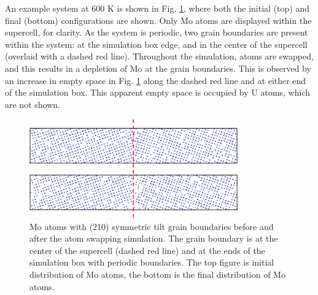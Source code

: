 \documentclass[review]{elsarticle}
\begin{document}
An example system at 600 K is shown in Fig. \ref{fig:600mcmd}, where both the initial (top) and final (bottom) configurations are shown. Only Mo atoms are displayed within the supercell, for clarity. As the system is periodic, two grain boundaries are present within the system: at the simulation box edge, and in the center of the supercell (overlaid with a dashed red line). Throughout the simulation, atoms are swapped, and this results in a depletion of Mo at the grain boundaries. This is observed by an increase in empty space in Fig. \ref{fig:600mcmd} along the dashed red line and at either end of the simulation box. This apparent empty space is occupied by U atoms, which are not shown.

\begin{figure}[h]
 \centering
 \includegraphics[width=0.8\textwidth]{600mcmd.png} 
 \caption{Mo atoms with (210) symmetric tilt grain boundaries before and after the atom swapping simulation. The grain boundary is at the center of the supercell (dashed red line) and at the ends of the simulation box with periodic boundaries. The top figure is initial distribution of Mo atoms, the bottom is the final distribution of Mo atoms.}
 \label{fig:600mcmd}
\end{figure}

\FloatBarrier
\end{document}
